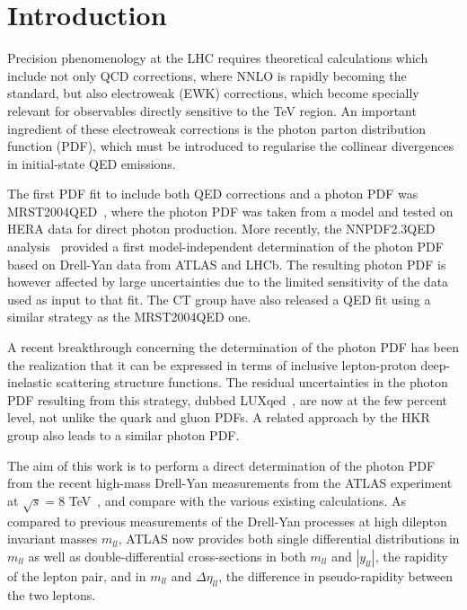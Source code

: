 \section{Introduction}

Precision phenomenology at the LHC requires theoretical calculations which
include not only QCD corrections, where NNLO is rapidly becoming
the standard, but also electroweak (EWK) corrections, which become
specially relevant for observables directly sensitive to the TeV region.
%
An important ingredient of these electroweak corrections is
the photon parton distribution function (PDF), which must
be introduced
to regularise the collinear divergences in initial-state QED emissions.

The first PDF fit to include both QED corrections and a photon PDF
was MRST2004QED~\cite{Martin:2004dh},
where the photon PDF was taken from a model
and tested on HERA data for direct photon production.
%
More recently, the NNPDF2.3QED analysis~\cite{Ball:2013hta}
provided a first model-independent
determination of the photon PDF based on Drell-Yan data
from ATLAS and LHCb.
%
The resulting photon PDF is however affected by large uncertainties
due to the limited sensitivity of the data used as input to that
fit.
%
The CT group have also released a QED fit using a similar strategy
as the MRST2004QED one.

A recent breakthrough concerning the determination of the
photon PDF has been the realization that it can be expressed
in terms of inclusive lepton-proton deep-inelastic scattering
structure functions.
%
The residual uncertainties in the photon PDF resulting from
this strategy, dubbed LUXqed~\cite{Manohar:2016nzj}, are now at the few percent level,
not unlike the quark and gluon PDFs.
%
A related approach by the HKR~\cite{Harland-Lang:2016apc}
group also leads to a similar photon PDF.

The aim of this work is to perform a direct determination
of the photon PDF from the recent high-mass Drell-Yan measurements
from the ATLAS experiment at $\sqrt{s}=8$ TeV~\cite{Aad:2016zzw},
and compare
with the various existing calculations.
%
As compared to previous measurements of the Drell-Yan processes
at high dilepton invariant masses $m_{ll}$, ATLAS now provides
both single differential distributions in $m_{ll}$ as well
as double-differential cross-sections in both $m_{ll}$
and $|y_{ll}|$, the rapidity of the lepton pair,
and in  $m_{ll}$ and $\Delta\eta_{ll}$, the difference in pseudo-rapidity
between the two leptons.

